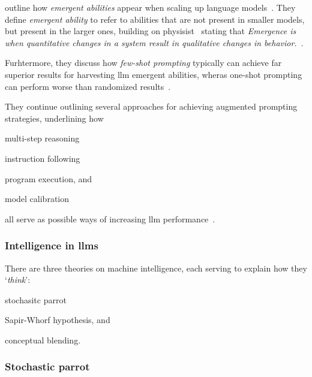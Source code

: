 \citeauthor{emergentabilitiesLLM} outline how \textit{emergent abilities} appear
when scaling up language models~\cite[1]{emergentabilitiesLLM}. They define
\textit{emergent ability} to refer to abilities that are not present in smaller
models, but present in the larger ones\cite[1]{emergentabilitiesLLM}, building
on physisist~\citeauthor{anderson1972more} stating that \textit{Emergence is
    when quantitative changes in a system result in qualitative changes in
    behavior.}~\cite[2]{emergentabilitiesLLM}.

Furhtermore, they discuss how \textit{few-shot prompting} typically can achieve
far superior results for harvesting \acrshort{llm} emergent abilities, wheras
one-shot prompting can perform worse than randomized
results~\cite[3-4]{emergentabilitiesLLM}.

They continue outlining several approaches for achieving augmented prompting
strategies, underlining how \begin{inparaenum}
    \item multi-step reasoning
    \item instruction following
    \item program execution,
    and
    \item model calibration
\end{inparaenum}
all serve as possible ways of increasing \acrshort{llm} performance~\cite[5]{emergentabilitiesLLM}.


\subsubsection{Intelligence in \acrshort{llms}}\label{sec:llmIntelligence}

There are three theories on machine intelligence, each serving to
explain how they `\textit{think}': \begin{inparaenum}
    \item stochasitc parrot
    \item Sapir-Whorf hypothesis,
    and
    \item conceptual blending.
\end{inparaenum}

\subsubsection*{Stochastic parrot}\label{sec:llmParrot}

